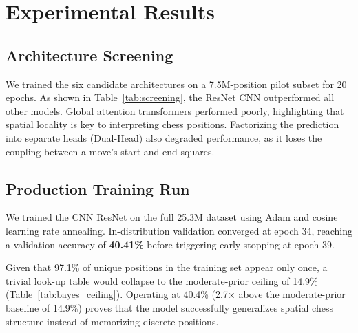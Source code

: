 \documentclass[journal]{IEEEtran}
\begin{document}
\section{Experimental Results}

\subsection{Architecture Screening}
We trained the six candidate architectures on a 7.5M-position pilot subset for 20 epochs. As shown in Table~\ref{tab:screening}, the ResNet CNN outperformed all other models. Global attention transformers performed poorly, highlighting that spatial locality is key to interpreting chess positions. Factorizing the prediction into separate heads (Dual-Head) also degraded performance, as it loses the coupling between a move's start and end squares.

\begin{table}[h]
\caption{Architecture Screening Results}
\label{tab:screening}
\centering
{}
\end{table}

\subsection{Production Training Run}
We trained the CNN ResNet on the full 25.3M dataset using Adam and cosine learning rate annealing. In-distribution validation converged at epoch 34, reaching a validation accuracy of \textbf{40.41\%} before triggering early stopping at epoch 39.

Given that 97.1\% of unique positions in the training set appear only once, a trivial look-up table would collapse to the moderate-prior ceiling of 14.9\% (Table~\ref{tab:bayes_ceiling}). Operating at 40.4\% (2.7$\times$ above the moderate-prior baseline of 14.9\%) proves that the model successfully generalizes spatial chess structure instead of memorizing discrete positions.
\end{document}
